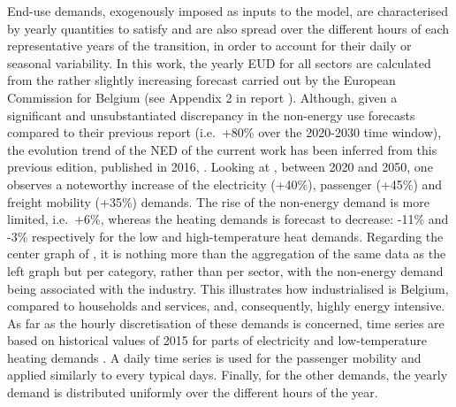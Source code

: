 \documentclass[11pt,twoside,a4paper,english]{article}
\def\ie{i.e.\ }
\begin{document}
End-use demands, exogenously imposed as inputs to the model, are characterised by yearly quantities to satisfy and are also spread over the different hours of each representative years of the transition, in order to account for their daily or seasonal variability. In this work, the yearly \gls{EUD} for all sectors are calculated from the rather slightly increasing forecast carried out by the European Commission for Belgium (see Appendix 2 in report \cite{EuropeanCommission2021}). Although, given a significant and unsubstantiated discrepancy in the non-energy use forecasts compared to their previous report (\ie +80\% over the 2020-2030 time window), the evolution trend of the \gls{NED} of the current work has been inferred from this previous edition, published in 2016, \cite{EuropeanCommission2016}. Looking at , between 2020 and 2050, one observes a noteworthy increase of the electricity (+40\%), passenger (+45\%) and freight mobility (+35\%) demands. The rise of the non-energy demand is more limited, \ie +6\%, whereas the heating demands is forecast to decrease: -11\% and -3\% respectively for the low and high-temperature heat demands. Regarding the center graph of , it is nothing more than the aggregation of the same data as the left graph but per category, rather than per sector, with the non-energy demand being associated with the industry. This illustrates how industrialised is Belgium, compared to households and services, and, consequently, highly energy intensive.
As far as the hourly discretisation of these demands is concerned, time series are based on historical values of 2015 for parts of electricity and low-temperature heating demands \cite{Limpens2020}. A daily time series is used for the passenger mobility and applied similarly to every typical days. Finally, for the other demands, the yearly demand is distributed uniformly over the different hours of the year.
\end{document}
